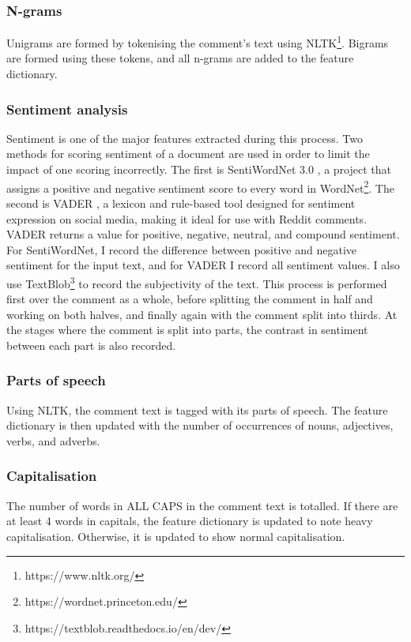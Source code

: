 \documentclass[a4paper,12pt]{article}
\begin{document}
\subsubsection{N-grams}
Unigrams are formed by tokenising the comment's text using NLTK\footnote{https://www.nltk.org/}. Bigrams are formed using these tokens, and all n-grams are added to the feature dictionary.

\subsubsection{Sentiment analysis}
Sentiment is one of the major features extracted during this process. Two methods for scoring sentiment of a document are used in order to limit the impact of one scoring incorrectly. The first is SentiWordNet 3.0 \cite{baccianellaSENTIWORDNETEnhancedLexical2010}, a project that assigns a positive and negative sentiment score to every word in WordNet\footnote{https://wordnet.princeton.edu/}. The second is VADER \cite{huttoVADERParsimoniousRulebased2014}, a lexicon and rule-based tool designed for sentiment expression on social media, making it ideal for use with Reddit comments. VADER returns a value for positive, negative, neutral, and compound sentiment. For SentiWordNet, I record the difference between positive and negative sentiment for the input text, and for VADER I record all sentiment values. I also use TextBlob\footnote{https://textblob.readthedocs.io/en/dev/} to record the subjectivity of the text. This process is performed first over the comment as a whole, before splitting the comment in half and working on both halves, and finally again with the comment split into thirds. At the stages where the comment is split into parts, the contrast in sentiment between each part is also recorded.

\subsubsection{Parts of speech}
Using NLTK, the comment text is tagged with its parts of speech. The feature dictionary is then updated with the number of occurrences of nouns, adjectives, verbs, and adverbs.

\subsubsection{Capitalisation}
The number of words in ALL CAPS in the comment text is totalled. If there are at least 4 words in capitals, the feature dictionary is updated to note heavy capitalisation. Otherwise, it is updated to show normal capitalisation.
\end{document}
